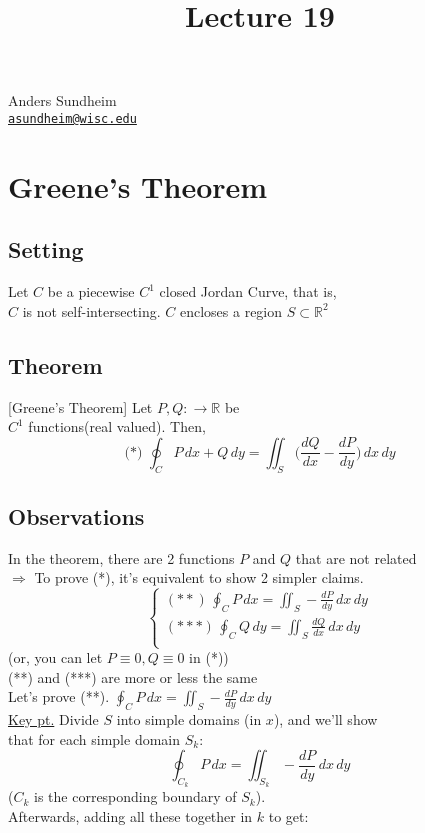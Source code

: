 \documentclass[12pt]{article}
\title{Lecture 19}
\newcommand*\circled[1]{\tikz[baseline=(char.base)]{
    \node[shape=circle,draw,inner sep=2pt] (char) {#1};}}
\newcommand{\BR}{\mathbb R}
\begin{document}
\maketitle
\vspace*{-0.25in}
\begin{center}
	Anders Sundheim \\
	\href{mailto:asundheim@wisc.edu}{{\tt asundheim@wisc.edu}}
\end{center}
\section*{Greene's Theorem}
\subsection*{Setting}
    Let $C$ be a piecewise $C^1$ closed Jordan Curve, that is, \\
    $C$ is not self-intersecting.  $C$ encloses a region $S\subset\BR^2$ \\
\subsection*{Theorem} [Greene's Theorem] Let $P,Q:\rightarrow\BR$ be \\
    $C^1$ functions(real valued). Then, \\
    \[ \text{(*) }\oint_CP\,dx+Q\,dy=\iint_S\bigg(\frac{dQ}{dx}-\frac{dP}{dy}\bigg)\,dx\,dy \]
\subsection*{Observations}
    \circled{1} In the theorem, there are 2 functions $P$ and $Q$ that are not related \\
    $\Rightarrow$ To prove (*), it's equivalent to show 2 simpler claims. \\
    \[
        \begin{cases}
            (**)\,\oint_CP\,dx=\iint_S-\frac{dP}{dy}\,dx\,dy \\
            (***)\,\oint_CQ\,dy=\iint_S\frac{dQ}{dx}\,dx\,dy \\
        \end{cases}
    \]
    (or, you can let $P\equiv 0, Q\equiv 0$ in (*)) \\
    (**) and (***) are more or less the same \\
    \circled{2} Let's prove (**). $\oint_CP\,dx=\iint_S-\frac{dP}{dy}\,dx\,dy$ \\
    \underline{Key pt.} Divide $S$ into simple domains (in $x$), and we'll show \\
    that for each simple domain $S_k$: \\
    \[ \oint_{C_k}P\,dx=\iint_{S_k}-\frac{dP}{dy}\,dx\,dy \]
    ($C_k$ is the corresponding boundary of $S_k$). \\
    Afterwards, adding all these together in $k$ to get:
\end{document}
